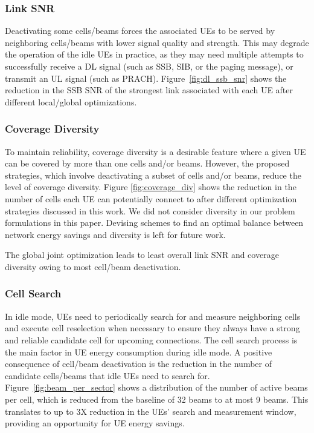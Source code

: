 \subsubsection{Link SNR}
Deactivating some cells/beams forces the associated UEs to be served by neighboring cells/beams with lower signal quality and strength. This may degrade the operation of the idle UEs in practice, as they may need multiple attempts to successfully receive a DL signal (such as SSB, SIB, or the paging message), or transmit an UL signal (such as PRACH). 
Figure~\ref{fig:dl_ssb_snr} shows the reduction in the SSB SNR of the strongest link associated with each UE after different local/global optimizations. 

\subsubsection{Coverage Diversity} 
To maintain reliability, coverage diversity is a desirable feature where a given UE can be covered by more than one cells and/or beams. However, the proposed strategies, which involve deactivating a subset of cells and/or beams, reduce the level of coverage diversity. 
Figure \ref{fig:coverage_div} shows the reduction in the number of cells each UE can potentially connect to after different optimization strategies discussed in this work. 
We did not consider diversity in our problem formulations in this paper. Devising schemes to find an optimal balance between network energy savings and diversity is left for future work.

The global joint optimization leads to least overall link SNR and coverage diversity owing to most cell/beam deactivation.
\subsubsection{Cell Search}
In idle mode, UEs need to periodically search for and measure neighboring cells and execute cell reselection when necessary to ensure they always have a strong and reliable candidate cell for upcoming connections. 
The cell search process is the main factor in UE energy consumption during idle mode. A positive consequence of cell/beam deactivation is the reduction in the number of candidate cells/beams that idle UEs need to search for. 
Figure~\ref{fig:beam_per_sector} shows a distribution of the number of active beams per cell, which is reduced from the baseline of 32 beams to at most 9 beams. This translates to up to 3X reduction in the UEs' search and measurement window, providing an opportunity for UE energy savings. 



